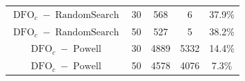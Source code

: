 \begin{subappendices}
\begin{table}[htb]
\begin{center}
\begin{tabular}{cc|cc|c}
$\operatorname{DFO}_c-\operatorname{RandomSearch}$  &30&	568	&6	&37.9\%\\
$\operatorname{DFO}_c-\operatorname{RandomSearch}$ &50&	527	&5&	38.2\%\\
\hline
$\operatorname{DFO}_c-\operatorname{Powell}$ &30&	4889&	5332&	14.4\%\\
$\operatorname{DFO}_c-\operatorname{Powell}$ &50&	4578	&4076&	7.3\%\\



\end{tabular}
\end{center}
\end{table}

\end{subappendices}
